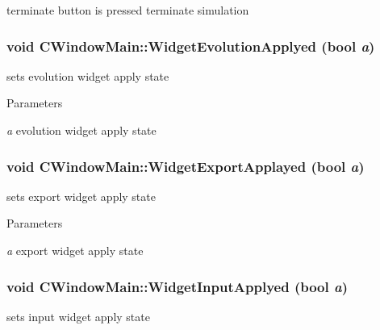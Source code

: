 \label{classCWindowMain_a0664061226a46527c08baa79c77c021e}
terminate button is pressed terminate simulation \hypertarget{classCWindowMain_adbaea71f7ed0bd6ad2ee1c7ee3183933}{
\subsubsection[{WidgetEvolutionApplyed}]{\setlength{\rightskip}{0pt plus 5cm}void CWindowMain::WidgetEvolutionApplyed (bool {\em a})}}
\label{classCWindowMain_adbaea71f7ed0bd6ad2ee1c7ee3183933}
sets evolution widget apply state


\begin{DoxyParams}{Parameters}
\item[{\em a}]evolution widget apply state \end{DoxyParams}
\hypertarget{classCWindowMain_a860e2fe5338da7007566e53382d2cf35}{
\subsubsection[{WidgetExportApplayed}]{\setlength{\rightskip}{0pt plus 5cm}void CWindowMain::WidgetExportApplayed (bool {\em a})}}
\label{classCWindowMain_a860e2fe5338da7007566e53382d2cf35}
sets export widget apply state


\begin{DoxyParams}{Parameters}
\item[{\em a}]export widget apply state \end{DoxyParams}
\hypertarget{classCWindowMain_a5c044b750d1626f1d87a7ef57c573dac}{
\subsubsection[{WidgetInputApplyed}]{\setlength{\rightskip}{0pt plus 5cm}void CWindowMain::WidgetInputApplyed (bool {\em a})}}
\label{classCWindowMain_a5c044b750d1626f1d87a7ef57c573dac}
sets input widget apply state


